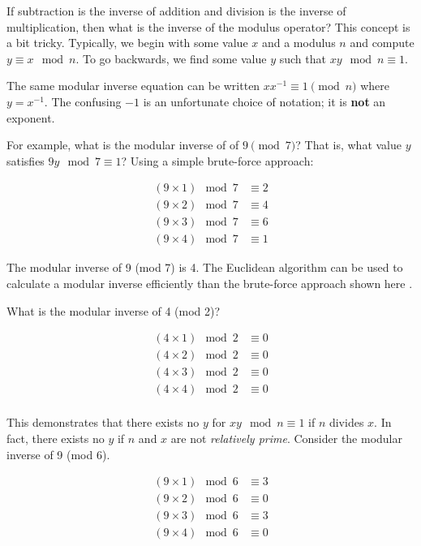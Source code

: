 \documentclass{book}
\begin{document}
If subtraction is the inverse of addition and division is the inverse of multiplication, then what is the inverse of the modulus operator? This concept is a bit tricky. Typically, we begin with some value $x$ and a modulus $n$ and compute $y \equiv x \mod n$. To go backwards, we find some value $y$ such that $xy \mod n \equiv 1$.

The same modular inverse equation can be written $x x^{-1} \equiv 1 \pmod{n}$ where $y=x^{-1}$. The confusing $-1$ is an unfortunate choice of notation; it is \textbf{not} an exponent.

For example, what is the modular inverse of of $9 \pmod{7}$? That is, what value $y$ satisfies $9y \mod 7 \equiv 1$? Using a simple brute-force approach:

\begin{align*}
(9 \times 1) \mod 7 &\equiv 2 \\
(9 \times 2) \mod 7 &\equiv 4 \\
(9 \times 3) \mod 7 &\equiv 6 \\
(9 \times 4) \mod 7 &\equiv 1
\end{align*}

The modular inverse of 9 (mod 7) is 4. The Euclidean algorithm can be used to calculate a modular inverse efficiently than the brute-force approach shown here \cite{weissteinModular}.

What is the modular inverse of 4 (mod 2)?

\begin{align*}
(4 \times 1) \mod 2 &\equiv 0 \\
(4 \times 2) \mod 2 &\equiv 0 \\
(4 \times 3) \mod 2 &\equiv 0 \\
(4 \times 4) \mod 2 &\equiv 0 \\
\end{align*}

This demonstrates that there exists no $y$ for $xy \mod n \equiv 1$ if $n$ divides $x$. In fact, there exists no $y$ if $n$ and $x$ are not \textit{relatively prime}. Consider the modular inverse of 9 (mod 6).

\begin{align*}
(9 \times 1) \mod 6 &\equiv 3 \\
(9 \times 2) \mod 6 &\equiv 0 \\
(9 \times 3) \mod 6 &\equiv 3 \\
(9 \times 4) \mod 6 &\equiv 0 \\
\end{align*}
\end{document}
